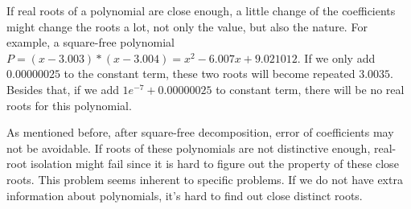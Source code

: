 If real roots of a polynomial are close enough, a little change of the
coefficients might change the roots a lot, not only the value, but also the
nature. For example, a square-free polynomial $P = (x-3.003)*(x-3.004)=x^2  -
6.007x + 9.021012$. If we only add $0.00000025$ to the constant term, these two
roots will become repeated $3.0035$. Besides that, if we add $1e^{-7} +
0.00000025$ to constant term, there will be no real roots for this polynomial.

As mentioned before, after square-free decomposition, error of coefficients may
not be avoidable. If roots of these polynomials are not distinctive enough,
real-root isolation might fail since it is hard to figure out the property of
these close roots. This problem seems inherent to specific problems. If we do not
have extra information about polynomials, it's hard to find out close distinct
roots.
